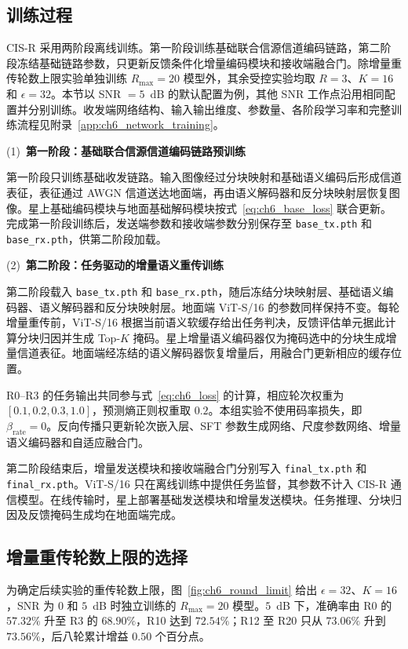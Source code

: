 \subsection{训练过程}
\label{subsec:ch6_training_process}

CIS-R 采用两阶段离线训练。第一阶段训练基础联合信源信道编码链路，第二阶段冻结基础链路参数，只更新反馈条件化增量编码模块和接收端融合门。除增量重传轮数上限实验单独训练 $R_{\max}=20$ 模型外，其余受控实验均取 $R=3$、$K=16$ 和 $\epsilon=32$。本节以 SNR $=5$~dB 的默认配置为例，其他 SNR 工作点沿用相同配置并分别训练。收发端网络结构、输入输出维度、参数量、各阶段学习率和完整训练流程见附录~\ref{app:ch6_network_training}。

\noindent(1)~\textbf{第一阶段：基础联合信源信道编码链路预训练}

第一阶段只训练基础收发链路。输入图像经过分块映射和基础语义编码后形成信道表征，表征通过 AWGN 信道送达地面端，再由语义解码器和反分块映射层恢复图像。星上基础编码模块与地面基础解码模块按式~\eqref{eq:ch6_base_loss} 联合更新。完成第一阶段训练后，发送端参数和接收端参数分别保存至 \texttt{base\_tx.pth} 和 \texttt{base\_rx.pth}，供第二阶段加载。

\noindent(2)~\textbf{第二阶段：任务驱动的增量语义重传训练}

第二阶段载入 \texttt{base\_tx.pth} 和 \texttt{base\_rx.pth}，随后冻结分块映射层、基础语义编码器、语义解码器和反分块映射层。地面端 ViT-S/16 的参数同样保持不变。每轮增量重传前，ViT-S/16 根据当前语义软缓存给出任务判决，反馈评估单元据此计算分块归因并生成 Top-$K$ 掩码。星上增量语义编码器仅为掩码选中的分块生成增量信道表征。地面端经冻结的语义解码器恢复增量后，用融合门更新相应的缓存位置。

R0--R3 的任务输出共同参与式~\eqref{eq:ch6_loss} 的计算，相应轮次权重为 $[0.1,0.2,0.3,1.0]$，预测熵正则权重取 $0.2$。本组实验不使用码率损失，即 $\beta_{\mathrm{rate}}=0$。反向传播只更新轮次嵌入层、SFT 参数生成网络、尺度参数网络、增量语义编码器和自适应融合门。

第二阶段结束后，增量发送模块和接收端融合门分别写入 \texttt{final\_tx.pth} 和 \texttt{final\_rx.pth}。ViT-S/16 只在离线训练中提供任务监督，其参数不计入 CIS-R 通信模型。在线传输时，星上部署基础发送模块和增量发送模块。任务推理、分块归因及反馈掩码生成均在地面端完成。

\subsection{增量重传轮数上限的选择}
\label{subsec:ch6_round_limit}

为确定后续实验的重传轮数上限，图~\ref{fig:ch6_round_limit} 给出 $\epsilon=32$、$K=16$，SNR 为 $0$ 和 $5$~dB 时独立训练的 $R_{\max}=20$ 模型。$5$~dB 下，准确率由 R0 的 $57.32\%$ 升至 R3 的 $68.90\%$，R10 达到 $72.54\%$；R12 至 R20 只从 $73.06\%$ 升到 $73.56\%$，后八轮累计增益 $0.50$ 个百分点。

